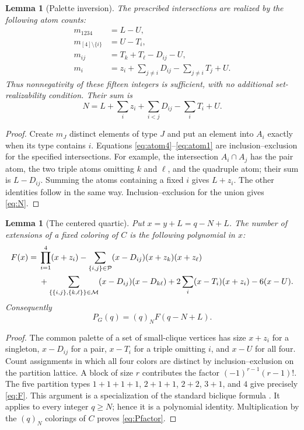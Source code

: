 \documentclass[11pt,a4paper]{article}
\newtheorem{lemma}[theorem]{Lemma}
\theoremstyle{definition}
\newcommand{\pairs}{\mathcal P}
\newcommand{\parts}{\mathcal M}
\newcommand{\fall}[2]{(#1)_{#2}}
\begin{document}
\begin{lemma}[Palette inversion]\label{lem:venn}
The prescribed intersections are realized by the following atom counts:
\begin{align}
 m_{1234}&=L-U,\label{eq:atom4}\\
 m_{[4]\setminus\{i\}}&=U-T_i,\label{eq:atom3}\\
 m_{ij}&=T_k+T_\ell-D_{ij}-U,\label{eq:atom2}\\
 m_i&=z_i+\sum_{j\ne i}D_{ij}-\sum_{j\ne i}T_j+U.\label{eq:atom1}
\end{align}
Thus nonnegativity of these fifteen integers is sufficient, with no
additional set-realizability condition. Their sum is
\begin{equation}\label{eq:N}
 N=L+\sum_i z_i+\sum_{i<j}D_{ij}-\sum_iT_i+U.
\end{equation}
\end{lemma}
\begin{proof}
Create $m_J$ distinct elements of type $J$ and put an element into $A_i$
exactly when its type contains $i$. Equations
\eqref{eq:atom4}--\eqref{eq:atom1} are inclusion--exclusion for the
specified intersections. For example, the intersection $A_i\cap A_j$
has the pair atom, the two triple atoms omitting $k$ and $\ell$, and
the quadruple atom; their sum is $L-D_{ij}$. Summing the atoms containing
a fixed $i$ gives $L+z_i$. The other identities follow in the same way.
Inclusion--exclusion for the union gives \eqref{eq:N}.
\end{proof}

\begin{lemma}[The centered quartic]\label{lem:quartic}
Put $x=y+L=q-N+L$. The number of extensions of a fixed coloring of $C$
is the following polynomial in $x$:
\begin{align}
 F(x)={}&\prod_{i=1}^4(x+z_i)
 -\sum_{\{i,j\}\in\pairs}(x-D_{ij})(x+z_k)(x+z_\ell)\notag\\
 &+\sum_{\{\{i,j\},\{k,\ell\}\}\in\parts}(x-D_{ij})(x-D_{k\ell})
 +2\sum_i(x-T_i)(x+z_i)-6(x-U).\label{eq:F}
\end{align}
Consequently
\begin{equation}\label{eq:Pfactor}
 P_G(q)=\fall qN F(q-N+L).
\end{equation}
\end{lemma}
\begin{proof}
The common palette of a set of small-clique vertices has size $x+z_i$
for a singleton, $x-D_{ij}$ for a pair, $x-T_i$ for a triple omitting
$i$, and $x-U$ for all four. Count assignments in which all four colors
are distinct by inclusion--exclusion on the partition lattice. A block of
size $r$ contributes the factor $(-1)^{r-1}(r-1)!$. The five partition
types $1+1+1+1$, $2+1+1$, $2+2$, $3+1$, and $4$ give precisely
\eqref{eq:F}. This argument is a specialization of the standard biclique
formula \cite[Proposition 9]{CM}.
It applies to every integer $q\ge N$; hence it is a polynomial identity.
Multiplication by the $\fall qN$ colorings of $C$ proves
\eqref{eq:Pfactor}.
\end{proof}
\end{document}
